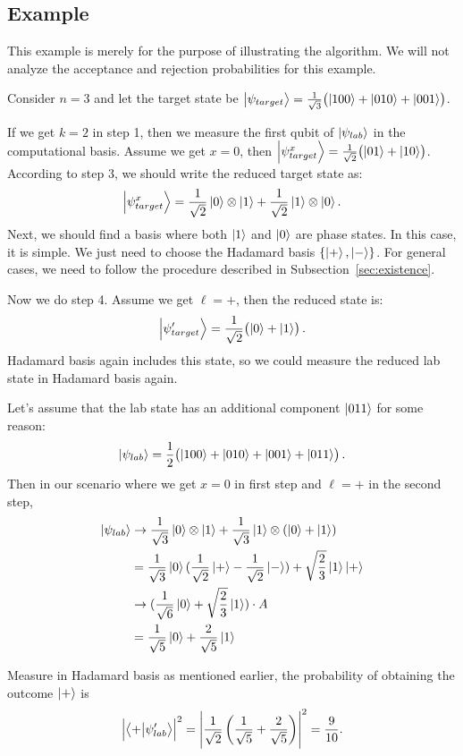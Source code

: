 \subsection{Example}
This example is merely for the purpose of illustrating the algorithm. We will not analyze the acceptance and rejection probabilities for this example. 

Consider $n=3$ and let the target state be $\ket{\psi_{target}} = \frac{1}{\sqrt{3}}\!\left(\ket{100} + \ket{010} + \ket{001}\right)$. 

If we get $k=2$ in step 1, then we measure the first qubit of $\ket{\psi_{lab}}$ in the computational basis.
Assume we get $x=0$, then $\ket{\psi_{target}^x} = \frac{1}{\sqrt{2}}\!\left(\ket{01} + \ket{10}\right)$. 
According to step 3, we should write the reduced target state as: 
\[
    \ket{\psi_{target}^x} = \frac{1}{\sqrt{2}}\ket{0} \otimes \ket{1} + \frac{1}{\sqrt{2}} \ket{1} \otimes \ket{0}.
\]
Next, we should find a basis where both $\ket{1}$ and $\ket{0}$ are phase states. 
In this case, it is simple. We just need to choose the Hadamard basis $\{\ket{+}, \ket{-}\}$. 
For general cases, we need to follow the procedure described in Subsection~\ref{sec:existence}. 

Now we do step 4. Assume we get $\ell = +$, then the reduced state is: 
\[
    \ket{\psi_{target}'} = \frac{1}{\sqrt{2}}\!\left(\ket{0} + \ket{1}\right).
\]
Hadamard basis again includes this state, so we could measure the reduced lab state in Hadamard basis again. 

Let's assume that the lab state has an additional component $\ket{011}$ for some reason: 
\[
    \ket{\psi_{lab}} = \frac{1}{2}\!\left(\ket{100} + \ket{010} + \ket{001} + \ket{011}\right).
\]
Then in our scenario where we get $x=0$ in first step and $\ell = +$ in the second step, 
\[
    \begin{aligned}
        \ket{\psi_{lab}} & \rightarrow \frac{1}{\sqrt{3}} \ket{0} \otimes \ket{1} + \frac{1}{\sqrt{3}} \ket{1} \otimes (\ket{0} + \ket{1}) \\ 
        &= \frac{1}{\sqrt{3}} \ket{0} (\frac{1}{\sqrt{2}}\ket{+} - \frac{1}{\sqrt{2}}\ket{-}) + \sqrt{\frac{2}{3}} \ket{1}\ket{+} \\ 
        & \rightarrow (\frac{1}{\sqrt{6}} \ket{0} + \sqrt{\frac{2}{3}} \ket{1}) \cdot A \\ 
        &= \frac{1}{\sqrt{5}} \ket{0} + \frac{2}{\sqrt{5}} \ket{1} 
    \end{aligned}
\]

Measure in Hadamard basis as mentioned earlier, the probability of obtaining the outcome $\ket+$ is
\[
    \left|
        \braket{+}{\psi_{lab}'}
    \right|^2
    =
    \left|
        \frac{1}{\sqrt2}
        \left(
            \frac{1}{\sqrt5}
            +
            \frac{2}{\sqrt5}
        \right)
    \right|^2
    =
    \frac{9}{10}.
\]

